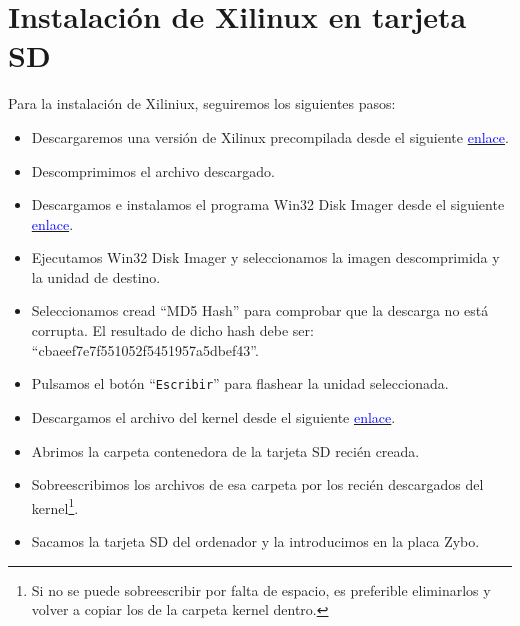 \documentclass[12pt,letterpaper]{article}
\begin{document}
\section{Instalación de Xilinux en tarjeta SD}
Para la instalación de Xiliniux, seguiremos los siguientes pasos:
\begin{itemize}
	\item Descargaremos una versión de Xilinux precompilada desde el siguiente \href{https://www.dropbox.com/s/9qgcoyjzoi764f0/2016.02.02.debian-cbaeef7e7f551052f5451957a5dbef43.zip?dl=0}{\textcolor{blue}{enlace}}.
	\item Descomprimimos el archivo descargado.
	\item Descargamos e instalamos el programa Win32 Disk Imager desde el siguiente \href{https://dw.uptodown.com/dwn/w76tVn7onjw1uZFTLSx7oG5vt1Y7gsfE_vPZCAa88I4YqL5Lp6S__CQhpJZGOLPYdjr73a4yGULPiRxv8Z2IsSRQjRPewPceg1Ol2gDzH3IkO3MHOCcuKQCNZwYI9Pvt/8_NYEhYYhGoJ_QXK-PQtvMDn5aHkqiWxwMofLuT2S5SxxDw2zu6f1OMCW0kqLnB0PGf-zrvou_F_nzjB4fn6Nuvp3WZcVrkFzGgNrhVLInDUMHPM0Jfxh76lJU_IATF7/9xrSlUN8npqZOVysN4LIc5iQnXIPmWNSWKNBLv7hcuQxXmyjX8qERxO48SnXIgr83mVVF-bcUsWJGGryhVqZ_LiBsoZmxxEyZE5JXoqVhCI=/}{\textcolor{blue}{enlace}}.
	\item Ejecutamos Win32 Disk Imager y seleccionamos la imagen descomprimida y la unidad de destino.
	\item Seleccionamos cread ``MD5 Hash'' para comprobar que la descarga no está corrupta. El resultado de dicho hash debe ser: ``cbaeef7e7f551052f5451957a5dbef43''.
	\item Pulsamos el botón ``\texttt{Escribir}'' para flashear la unidad seleccionada.
	\item Descargamos el archivo del kernel desde el siguiente \href{https://uc405c43ce82f6c3032b21ba76bf.dl.dropboxusercontent.com/cd/0/get/AehqJhpiTxZ90sAdGxOFqHxr04BAsug_4RaV6MPX5yBDOQBVaIpDw11X6LdVBi7DPsndN7IxeWYRcEmUAt4xnKoIeYJBRtYu4JtZ_M71as8xbw/file?_download_id=621489597300519201006251662619095482850364296264714456845096204891&_notify_domain=www.dropbox.com&dl=1}{\textcolor{blue}{enlace}}.
	\item Abrimos la carpeta contenedora de la tarjeta SD recién creada.
	\item Sobreescribimos los archivos de esa carpeta por los recién descargados del kernel\footnote{Si no se puede sobreescribir por falta de espacio, es preferible eliminarlos y volver a copiar los de la carpeta kernel dentro.}.
	\item Sacamos la tarjeta SD del ordenador y la introducimos en la placa Zybo.
\end{itemize}
\end{document}
